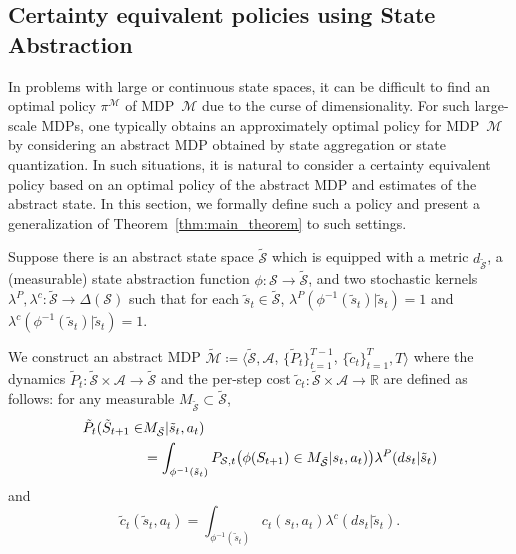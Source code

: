 \documentclass[letterpaper, 10pt]{IEEEtran}
\theoremstyle{plain}
\theoremstyle{nonumberplain}
\theoremstyle{plain}
\newcommand*\ALPHABET{\mathcal}
\newcommand*\ABSTRACT{\tilde}
\newcommand*\reals{\mathds{R}}
\begin{document}
\subsection{Certainty equivalent policies using State Abstraction}\label{sec:abstract}

In problems with large or continuous state spaces, it can be difficult to find an optimal policy $\pi^{\ALPHABET M}$ of MDP~$\ALPHABET M$ due to the  curse of dimensionality. For such large-scale MDPs, one typically obtains an approximately optimal policy for MDP~$\ALPHABET M$ by considering an abstract MDP obtained by state aggregation or state quantization. In such situations, it is natural to consider a certainty equivalent policy based on an optimal policy of the abstract MDP and estimates of the abstract state. In this section, we formally define such a policy and present a generalization of Theorem~\ref{thm:main_theorem} to such settings.


Suppose there is an abstract state space $\ABSTRACT {\ALPHABET S}$ which is equipped with a metric $d_{\ABSTRACT {\ALPHABET S}}$, a (measurable) state abstraction function $\phi \colon \ALPHABET S \to \ABSTRACT {\ALPHABET S}$, and two stochastic kernels $\lambda^P, \lambda^c \colon \ABSTRACT {\ALPHABET S} \to \Delta(\ALPHABET S)$ such that for each $\ABSTRACT s_t \in \ABSTRACT {\ALPHABET S}$, $\lambda^P(\phi^{-1}(\ABSTRACT s_t)|\ABSTRACT s_t) = 1$ and $\lambda^c(\phi^{-1}(\ABSTRACT s_t) | \ABSTRACT s_t) = 1$.

We construct an abstract MDP $\ABSTRACT {\ALPHABET M} \coloneqq \langle \ABSTRACT{\ALPHABET S}, \ALPHABET A$, $\{\ABSTRACT P_t\}_{t=1}^{T-1}$, $\{\ABSTRACT c_t\}_{t=1}^T, T \rangle$ where the dynamics $\ABSTRACT P_t \colon \ABSTRACT {\ALPHABET S} \times \ALPHABET A \to \ABSTRACT {\ALPHABET S}$ and the per-step cost $\ABSTRACT c_t \colon \ABSTRACT {\ALPHABET S} \times \ALPHABET A \to \reals$ are defined as follows: for any measurable $M_{\ABSTRACT {\ALPHABET S}} \subset \ABSTRACT {\ALPHABET S}$, 
\begin{align}
    \ABSTRACT P_t(\ABSTRACT S_{t+1}\in & M_{\ABSTRACT {\ALPHABET S}}|\ABSTRACT s_t,a_t)  \notag \\
    &= \int_{\phi^{-1}(\ABSTRACT s_t)} P_{\ALPHABET S,t}\bigl(\phi(S_{t+1})\in  M_{\ABSTRACT {\ALPHABET S}}|s_t,a_t)\bigr)\lambda^P(ds_t|\ABSTRACT s_t)
    \label{eq:abstract-P}
\end{align}
and
\begin{equation}\label{eq:abstract-c}
    \ABSTRACT c_t(\ABSTRACT s_t,a_t) = \int_{\phi^{-1}(\ABSTRACT s_t)}c_t(s_t,a_t)\lambda^c(ds_t|\ABSTRACT s_t).
\end{equation}
\end{document}
